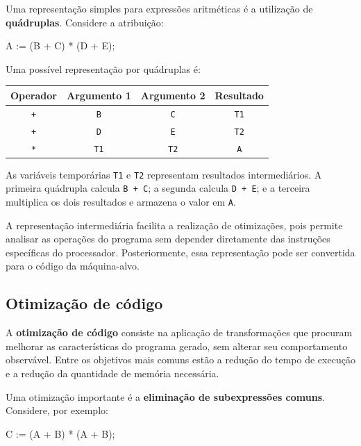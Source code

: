 \documentclass[
  brazilian,
  letterpaper,
]{book}
\newenvironment{Shaded}{\begin{snugshade}}{\end{snugshade}}
\newcommand{\NormalTok}[1]{\textcolor[rgb]{0.00,0.23,0.31}{#1}}
\theoremstyle{plain}
\theoremstyle{definition}
\theoremstyle{remark}
\begin{document}
Uma representação simples para expressões aritméticas é a utilização de
\textbf{quádruplas}. Considere a atribuição:

\begin{Shaded}
\begin{Highlighting}[]
\NormalTok{A := (B + C) * (D + E);}
\end{Highlighting}
\end{Shaded}

Uma possível representação por quádruplas é:

\begin{longtable*}[]{|c|c|c|c|}
\toprule\noalign{}
Operador & Argumento 1 & Argumento 2 & Resultado \\
\midrule\noalign{}
\endhead
\bottomrule\noalign{}
\endlastfoot
\texttt{+} & \texttt{B} & \texttt{C} & \texttt{T1} \\
\midrule
\texttt{+} & \texttt{D} & \texttt{E} & \texttt{T2} \\
\midrule
\texttt{*} & \texttt{T1} & \texttt{T2} & \texttt{A} \\
\end{longtable*}

As variáveis temporárias \texttt{T1} e \texttt{T2} representam
resultados intermediários. A primeira quádrupla calcula
\texttt{B\ +\ C}; a segunda calcula \texttt{D\ +\ E}; e a terceira
multiplica os dois resultados e armazena o valor em \texttt{A}.

A representação intermediária facilita a realização de otimizações, pois
permite analisar as operações do programa sem depender diretamente das
instruções específicas do processador. Posteriormente, essa
representação pode ser convertida para o código da máquina-alvo.

\subsection{Otimização de código}\label{otimizauxe7uxe3o-de-cuxf3digo}

A \textbf{otimização de código} consiste na aplicação de transformações
que procuram melhorar as características do programa gerado, sem alterar
seu comportamento observável. Entre os objetivos mais comuns estão a
redução do tempo de execução e a redução da quantidade de memória
necessária.

Uma otimização importante é a \textbf{eliminação de subexpressões
comuns}. Considere, por exemplo:

\begin{Shaded}
\begin{Highlighting}[]
\NormalTok{C := (A + B) * (A + B);}
\end{Highlighting}
\end{Shaded}
\end{document}

